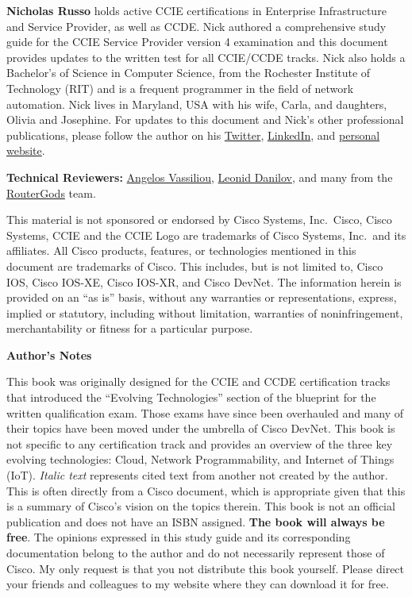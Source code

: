 \noindent
\textbf{Nicholas Russo} holds active CCIE certifications in Enterprise
Infrastructure and Service Provider, as well as CCDE\@. Nick authored a
comprehensive study guide for the CCIE Service Provider version 4 examination
and this document provides updates to the written test for all CCIE/CCDE tracks.
Nick also holds a Bachelor’s of Science in Computer Science, from the Rochester
Institute of Technology (RIT) and is a frequent programmer in the field of
network automation. Nick lives in Maryland, USA with his wife, Carla, and
daughters, Olivia and Josephine. For updates to this document and Nick’s other
professional publications, please follow the author on his
\href{https://twitter.com/nickrusso42518}{Twitter},
\href{https://www.linkedin.com/in/njrusmc}{LinkedIn}, and
\href{http://njrusmc.net}{personal website}.


\textbf{Technical Reviewers:}
\href{https://twitter.com/ipmess}{Angelos Vassiliou},
\href{https://twitter.com/iosxrqna}{Leonid Danilov}, and many from the
\href{https://www.meetup.com/routergods}{RouterGods} team.

This material is not sponsored or endorsed by Cisco Systems, Inc.\ Cisco, Cisco
Systems, CCIE and the CCIE Logo are trademarks of Cisco Systems, Inc.\ and its
affiliates. All Cisco products, features, or technologies mentioned in this
document are trademarks of Cisco. This includes, but is not limited to, Cisco
IOS, Cisco IOS-XE, Cisco IOS-XR, and Cisco DevNet. The information herein is
provided on an ``as is'' basis, without any warranties or representations,
express, implied or statutory, including without limitation, warranties of
noninfringement, merchantability or fitness for a particular purpose.

\textbf{Author’s Notes}

This book was originally designed for the CCIE and CCDE certification tracks that
introduced the ``Evolving Technologies'' section of the blueprint for the written
qualification exam. Those exams have since been overhauled and many of their
topics have been moved under the umbrella of Cisco DevNet.
This book is not specific to any certification track and provides
an overview of the three key evolving technologies: Cloud, Network
Programmability, and Internet of Things (IoT). \textit{Italic text} represents
cited text from another not created by the author. This is often directly
from a Cisco document, which is appropriate given that this is a summary of
Cisco’s vision on the topics therein. This book is not an official
publication and does not have an ISBN assigned. \textbf{The book will always be free}.
The opinions expressed in this study guide and its corresponding documentation
belong to the author and do not necessarily represent those of Cisco. My only
request is that you not distribute this book yourself. Please direct your
friends and colleagues to my website where they can download it for free.

